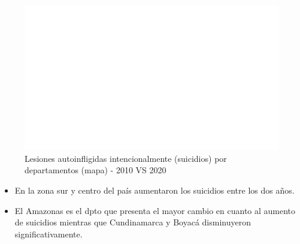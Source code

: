     \begin{figure}[H]
        \caption{Lesiones autoinfligidas intencionalmente (suicidios) por departamentos (mapa) - 2010 VS 2020 \label{map_result_2} }
        \begin{center}
        \includegraphics[width=\textwidth,keepaspectratio]{img/var_294_map.png}
        \end{center}
    \end{figure}
            \begin{itemize}
                \item En la zona sur y centro del país aumentaron los suicidios entre los dos años.
                \item El Amazonas es el dpto que presenta el mayor cambio en cuanto al aumento de suicidios mientras que Cundinamarca y Boyacá disminuyeron significativamente.
                \end{itemize}

